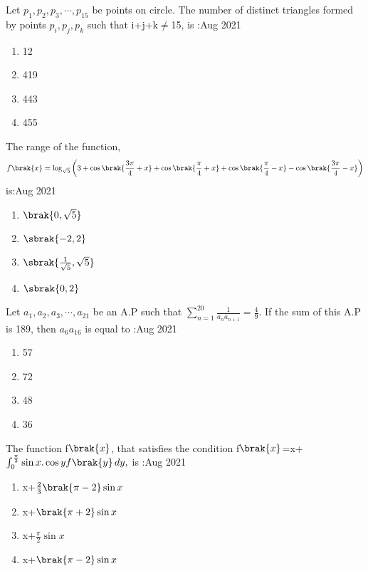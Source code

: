 \iffalse
  \title{Assignment}
  \author{EE24BTECH11038}
  \section{mcq-single}
\fi  
\item Let $p_1,p_2,p_3,\cdots,p_{15}$ be points on circle. The number of distinct triangles formed by points $p_i,p_j,p_k$ such that i+j+k$\neq$15, is :\hfill{Aug 2021}
\begin{enumerate}
    \item 12
    \item 419
    \item 443
    \item 455
\end{enumerate}
\bigskip
\item The range of the function,
\begin{align*}
    f\brak{x}=\log_{\sqrt{5}} \left(3+\cos{\brak{\frac{3\pi}{4}+x}}+\cos{\brak{\frac{\pi}{4}+x}}+\cos{\brak{\frac{\pi}{4}-x}}-\cos{\brak{\frac{3\pi}{4}-x}}\right)
\end{align*}
is:\hfill{Aug 2021}
\begin{enumerate}
    \item $\brak{0,\sqrt{5}}$\\
    \item $\sbrak{-2,2}$\\
    \item $\sbrak{\frac{1}{\sqrt{5}},\sqrt{5}}$\\
    \item $\sbrak{0,2}$
\end{enumerate}
\bigskip
\item Let $a_1,a_2,a_3,\cdots,a_{21}$ be an A.P such that $\sum_{n=1}^{20} \frac{1}{a_na_{n+1}}=\frac{4}{9}$. If the sum of this A.P is 189, then $a_6a_{16}$ is equal to :\hfill{Aug 2021}
\begin{enumerate}
    \item 57
    \item 72
    \item 48
    \item 36
\end{enumerate}
\bigskip
\item The function f$\brak{x}$, that satisfies the condition f$\brak{x}$=x+$\int_0^{\frac{\pi}{2}} \sin{x}.\cos{y}f\brak{y}\,dy,$ is :\hfill{Aug 2021}
\begin{enumerate}
    \item x+$\frac{2}{3}\brak{\pi-2}\sin{x}$
    \item  x+$\brak{\pi+2}\sin{x}$
     \item x+$\frac{\pi}{2}\sin{x}$
      \item x+$\brak{\pi-2}\sin{x}$
\end{enumerate}
